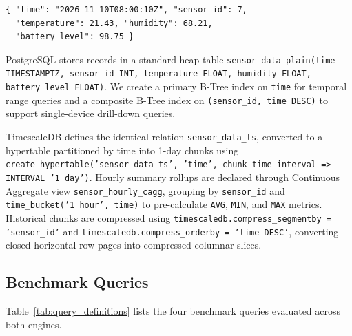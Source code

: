 \documentclass[conference,a4paper]{IEEEtran}
\newcommand{\code}[1]{\texttt{\small #1}}
\begin{document}
\noindent\begin{minipage}{\columnwidth}\footnotesize
\begin{verbatim}
{ "time": "2026-11-10T08:00:10Z", "sensor_id": 7,
  "temperature": 21.43, "humidity": 68.21,
  "battery_level": 98.75 }
\end{verbatim}\end{minipage}\par\vspace{3pt}

PostgreSQL stores records in a standard heap table \code{sensor\_data\_plain(time TIMESTAMPTZ, sensor\_id INT, temperature FLOAT, humidity FLOAT, battery\_level FLOAT)}. We create a primary B-Tree index on \code{time} for temporal range queries and a composite B-Tree index on \code{(sensor\_id, time DESC)} to support single-device drill-down queries.

TimescaleDB defines the identical relation \code{sensor\_data\_ts}, converted to a hypertable partitioned by time into 1-day chunks using \code{create\_hypertable('sensor\_data\_ts', 'time', chunk\_time\_interval => INTERVAL '1 day')}. Hourly summary rollups are declared through Continuous Aggregate view \code{sensor\_hourly\_cagg}, grouping by \code{sensor\_id} and \code{time\_bucket('1 hour', time)} to pre-calculate \code{AVG}, \code{MIN}, and \code{MAX} metrics. Historical chunks are compressed using \code{timescaledb.compress\_segmentby = 'sensor\_id'} and \code{timescaledb.compress\_orderby = 'time DESC'}, converting closed horizontal row pages into compressed columnar slices.

\subsection{Benchmark Queries}
Table~\ref{tab:query_definitions} lists the four benchmark queries evaluated across both engines.
\end{document}
